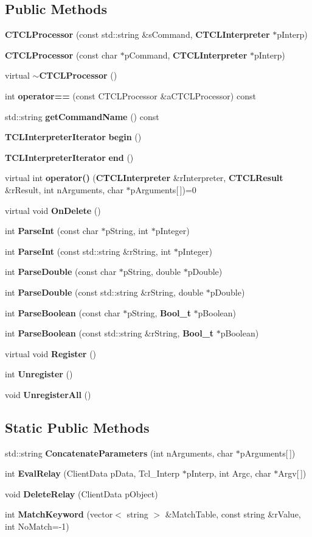 \subsection*{Public Methods}
\begin{CompactItemize}
\item 
{\bf CTCLProcessor} (const std::string \&s\-Command, {\bf CTCLInterpreter} $\ast$p\-Interp)
\item 
{\bf CTCLProcessor} (const char $\ast$p\-Command, {\bf CTCLInterpreter} $\ast$p\-Interp)
\item 
virtual {\bf $\sim$CTCLProcessor} ()
\item 
int {\bf operator==} (const CTCLProcessor \&a\-CTCLProcessor) const
\item 
std::string {\bf get\-Command\-Name} () const
\item 
{\bf TCLInterpreter\-Iterator} {\bf begin} ()
\item 
{\bf TCLInterpreter\-Iterator} {\bf end} ()
\item 
virtual int {\bf operator()} ({\bf CTCLInterpreter} \&r\-Interpreter, {\bf CTCLResult} \&r\-Result, int n\-Arguments, char $\ast$p\-Arguments[$\,$])=0
\item 
virtual void {\bf On\-Delete} ()
\item 
int {\bf Parse\-Int} (const char $\ast$p\-String, int $\ast$p\-Integer)
\item 
int {\bf Parse\-Int} (const std::string \&r\-String, int $\ast$p\-Integer)
\item 
int {\bf Parse\-Double} (const char $\ast$p\-String, double $\ast$p\-Double)
\item 
int {\bf Parse\-Double} (const std::string \&r\-String, double $\ast$p\-Double)
\item 
int {\bf Parse\-Boolean} (const char $\ast$p\-String, {\bf Bool\_\-t} $\ast$p\-Boolean)
\item 
int {\bf Parse\-Boolean} (const std::string \&r\-String, {\bf Bool\_\-t} $\ast$p\-Boolean)
\item 
virtual void {\bf Register} ()
\item 
int {\bf Unregister} ()
\item 
void {\bf Unregister\-All} ()
\end{CompactItemize}
\subsection*{Static Public Methods}
\begin{CompactItemize}
\item 
std::string {\bf Concatenate\-Parameters} (int n\-Arguments, char $\ast$p\-Arguments[$\,$])
\item 
int {\bf Eval\-Relay} (Client\-Data p\-Data, Tcl\_\-Interp $\ast$p\-Interp, int Argc, char $\ast$Argv[$\,$])
\item 
void {\bf Delete\-Relay} (Client\-Data p\-Object)
\item 
int {\bf Match\-Keyword} (vector$<$ string $>$ \&Match\-Table, const string \&r\-Value, int No\-Match=-1)
\end{CompactItemize}
